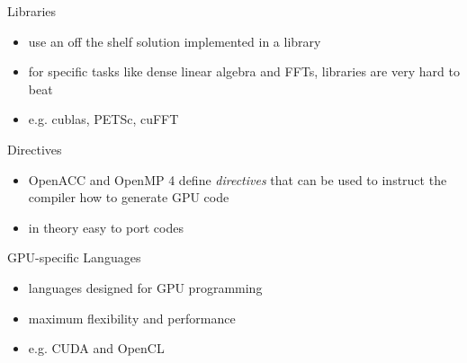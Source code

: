 \documentclass[aspectratio=43]{beamer}
\begin{document}
\begin{frame}[fragile]{}
    \begin{info}{Libraries}
        \begin{itemize}
            \item use an off the shelf solution implemented in a library
            \item for specific tasks like dense linear algebra and FFTs, libraries are very hard to beat
            \item e.g. cublas, PETSc, cuFFT
        \end{itemize}
    \end{info}

    \begin{info}{Directives}
        \begin{itemize}
            \item OpenACC and OpenMP 4 define \emph{directives} that can be used to instruct the compiler how to generate GPU code
            \item in theory easy to port codes
        \end{itemize}
    \end{info}

    \begin{info}{GPU-specific Languages}
        \begin{itemize}
            \item languages designed for GPU programming
            \item maximum flexibility and performance
            \item e.g. CUDA and OpenCL
        \end{itemize}
    \end{info}
\end{frame}
\end{document}
